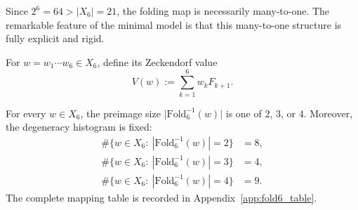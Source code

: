 Since $2^6=64>|X_6|=21$, the folding map is necessarily many-to-one.
The remarkable feature of the minimal model is that this many-to-one structure is fully explicit and rigid.

For $w=w_1\cdots w_6\in X_6$, define its Zeckendorf value
\[
V(w):=\sum_{k=1}^{6} w_k F_{k+1}.
\]

\begin{theorem}
\label{thm:fold6_preimages}
For every $w\in X_6$, the preimage size $\bigl|\mathrm{Fold}_6^{-1}(w)\bigr|$ is one of $2$, $3$, or $4$.
Moreover, the degeneracy histogram is fixed:
\[
\begin{aligned}
\#\{w\in X_6:\ |\mathrm{Fold}_6^{-1}(w)|=2\}&=8,\\
\#\{w\in X_6:\ |\mathrm{Fold}_6^{-1}(w)|=3\}&=4,\\
\#\{w\in X_6:\ |\mathrm{Fold}_6^{-1}(w)|=4\}&=9.
\end{aligned}
\]
The complete mapping table is recorded in Appendix~\ref{app:fold6_table}.
\end{theorem}

